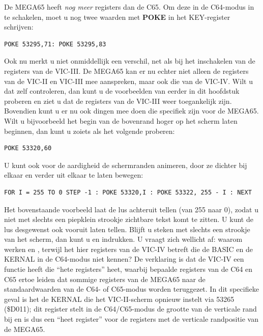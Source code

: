 De MEGA65 heeft \textit{nog meer} registers dan de C65. Om deze in de C64-modus in te schakelen, moet u nog twee waarden met {\bf POKE} in het KEY-register schrijven:

\begin{tcolorbox}[colback=black,coltext=white]
\verbatimfont{\codefont}
\begin{verbatim}
POKE 53295,71: POKE 53295,83
\end{verbatim}
\end{tcolorbox}

Ook nu merkt u niet onmiddellijk een verschil, net als bij het inschakelen van de registers van de VIC-III. De MEGA65 kan er nu echter niet alleen de registers van de VIC-II en VIC-III mee aanspreken, maar ook die van de VIC-IV. Wilt u dat zelf controleren, dan kunt u de voorbeelden van eerder in dit hoofdstuk proberen en ziet u dat de registers van de VIC-III weer toegankelijk zijn. Bovendien kunt u er nu ook dingen mee doen die specifiek zijn voor de MEGA65. Wilt u bijvoorbeeld het begin van de bovenrand hoger op het scherm laten beginnen, dan kunt u zoiets als het volgende proberen:

\begin{tcolorbox}[colback=black,coltext=white]
\verbatimfont{\codefont}
\begin{verbatim}
POKE 53320,60
\end{verbatim}
\end{tcolorbox}

U kunt ook voor de aardigheid de schermranden animeren, door ze dichter bij elkaar en verder uit elkaar te laten bewegen:

\begin{tcolorbox}[colback=black,coltext=white]
\verbatimfont{\codefont}
\begin{verbatim}
FOR I = 255 TO 0 STEP -1 : POKE 53320,I : POKE 53322, 255 - I : NEXT
\end{verbatim}
\end{tcolorbox}

Het bovenstaande voorbeeld laat de lus achteruit tellen (van 255 naar 0), zodat u niet met slechts een piepklein strookje zichtbare tekst komt te zitten. U kunt de lus desgewenst ook vooruit laten tellen. Blijft u steken met slechts een strookje van het scherm, dan kunt u  en  indrukken. U vraagt zich wellicht af: waarom werken  en , terwijl het hier registers van de VIC-IV betreft die de BASIC en de KERNAL in de C64-modus niet kennen? De verklaring is dat de VIC-IV een functie heeft die ``hete registers'' heet, waarbij bepaalde registers van de C64 en C65 ertoe leiden dat sommige registers van de MEGA65 naar de standaardwaarden van de C64- of C65-modus worden teruggezet. In dit specifieke geval is het de KERNAL die het VIC-II-scherm opnieuw instelt via 53265 (\$D011); dit register stelt in de C64/C65-modus de grootte van de verticale rand bij en is dus een ``heet register'' voor de registers met de verticale randpositie van de MEGA65.

